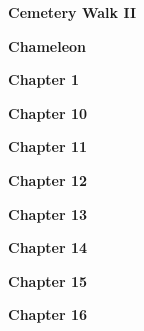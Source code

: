 \newline
\vspace{10pt} 
\begin{center}\textbf{Cemetery Walk II}\end{center}
\newline
\vspace{10pt} 
\begin{center}\textbf{Chameleon}\end{center}
\newline
\vspace{10pt} 
\begin{center}\textbf{Chapter 1}\end{center}
\newline
\vspace{10pt} 
\begin{center}\textbf{Chapter 10}\end{center}
\newline
\vspace{10pt} 
\begin{center}\textbf{Chapter 11}\end{center}
\newline
\vspace{10pt} 
\begin{center}\textbf{Chapter 12}\end{center}
\newline
\vspace{10pt} 
\begin{center}\textbf{Chapter 13}\end{center}
\newline
\vspace{10pt} 
\begin{center}\textbf{Chapter 14}\end{center}
\newline
\vspace{10pt} 
\begin{center}\textbf{Chapter 15}\end{center}
\newline
\vspace{10pt} 
\begin{center}\textbf{Chapter 16}\end{center}
